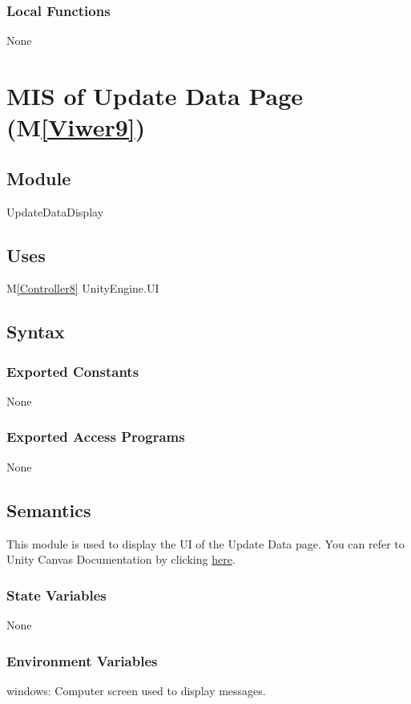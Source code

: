 \documentclass[12pt, titlepage]{article}
\newcommand{\mref}[1]{M\ref{#1}}
\begin{document}
\subsubsection{Local Functions}
None

\newpage

\section{MIS of Update Data Page (\mref{Viwer9})}

\subsection{Module}
UpdateDataDisplay

\subsection{Uses}
\mref{Controller8} 
UnityEngine.UI

\subsection{Syntax}
\subsubsection{Exported Constants}
None
\subsubsection{Exported Access Programs}
None

\subsection{Semantics}
This module is used to display the UI of the Update Data page.
You can refer to Unity Canvas Documentation by clicking 
\href{https://docs.unity3d.com/Packages/com.unity.ugui@1.0/manual/class-Canvas.html}{here}.
\subsubsection{State Variables}
None
\subsubsection{Environment Variables}
windows: Computer screen used to display messages.
\end{document}
